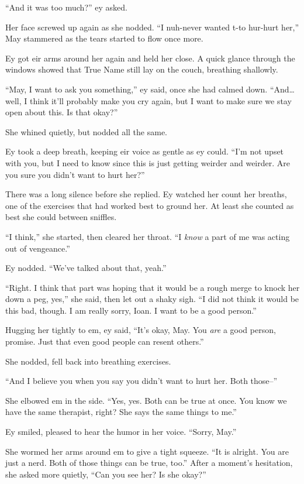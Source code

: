 ``And it was too much?'' ey asked.

Her face screwed up again as she nodded. ``I nuh-never wanted t-to hur-hurt her,'' May stammered as the tears started to flow once more.

Ey got eir arms around her again and held her close. A quick glance through the windows showed that True Name still lay on the couch, breathing shallowly.

``May, I want to ask you something,'' ey said, once she had calmed down. ``And\ldots well, I think it'll probably make you cry again, but I want to make sure we stay open about this. Is that okay?''

She whined quietly, but nodded all the same.

Ey took a deep breath, keeping eir voice as gentle as ey could. ``I'm not upset with you, but I need to know since this is just getting weirder and weirder. Are you sure you didn't want to hurt her?''

There was a long silence before she replied. Ey watched her count her breaths, one of the exercises that had worked best to ground her. At least she counted as best she could between sniffles.

``I think,'' she started, then cleared her throat. ``I \emph{know} a part of me was acting out of vengeance.''

Ey nodded. ``We've talked about that, yeah.''

``Right. I think that part was hoping that it would be a rough merge to knock her down a peg, yes,'' she said, then let out a shaky sigh. ``I did not think it would be this bad, though. I am really sorry, Ioan. I want to be a good person.''

Hugging her tightly to em, ey said, ``It's okay, May. You \emph{are} a good person, promise. Just that even good people can resent others.''

She nodded, fell back into breathing exercises.

``And I believe you when you say you didn't want to hurt her. Both those--''

She elbowed em in the side. ``Yes, yes. Both can be true at once. You know we have the same therapist, right? She says the same things to me.''

Ey smiled, pleased to hear the humor in her voice. ``Sorry, May.''

She wormed her arms around em to give a tight squeeze. ``It is alright. You are just a nerd. Both of those things can be true, too.'' After a moment's hesitation, she asked more quietly, ``Can you see her? Is she okay?''

